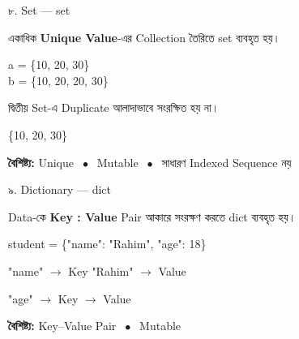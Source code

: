 

\noindent
\begin{minipage}[t]{0.49\linewidth}

\begin{examplebox}{৮. Set — \textenglish{\ttfamily set}}

একাধিক \textbf{Unique Value}-এর Collection তৈরিতে
\textenglish{\ttfamily set}
ব্যবহৃত হয়।

\begin{codebox}
\begin{english}
\ttfamily
a = \{10, 20, 30\}\\
b = \{10, 20, 20, 30\}
\end{english}
\end{codebox}

দ্বিতীয় Set-এ Duplicate
\textenglish{}
আলাদাভাবে সংরক্ষিত হয় না।

\begin{center}
\textenglish{\ttfamily \{10, 20, 30\}}
\end{center}

\textbf{বৈশিষ্ট্য:}\quad
Unique
\(\;\bullet\;\)
Mutable
\(\;\bullet\;\)
সাধারণ Indexed Sequence নয়

\end{examplebox}

\end{minipage}
\hfill
\begin{minipage}[t]{0.49\linewidth}

\begin{examplebox}{৯. Dictionary — \textenglish{\ttfamily dict}}

Data-কে
\textbf{Key : Value}
Pair আকারে সংরক্ষণ করতে
\textenglish{\ttfamily dict}
ব্যবহৃত হয়।

\begin{codebox}
\begin{english}
\ttfamily
student = \{"name": "Rahim", "age": 18\}
\end{english}
\end{codebox}

\begin{center}

\textenglish{\ttfamily "name"}
\(\longrightarrow\)
Key
\qquad
\textenglish{\ttfamily "Rahim"}
\(\longrightarrow\)
Value

\medskip

\textenglish{\ttfamily "age"}
\(\longrightarrow\)
Key
\qquad
\textenglish{}
\(\longrightarrow\)
Value

\end{center}

\textbf{বৈশিষ্ট্য:}\quad
Key--Value Pair
\(\;\bullet\;\)
Mutable

\end{examplebox}

\end{minipage}

